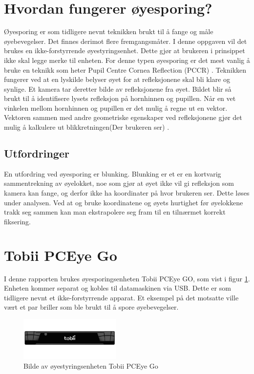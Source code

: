 \documentclass[phd,tocprelim]{cornell}
\begin{document}
\section{Hvordan fungerer øyesporing?}

Øyesporing er som tidligere nevnt teknikken brukt til å fange og måle øyebevegelser.
Det finnes derimot flere fremgangsmåter. I denne oppgaven vil det brukes en ikke-forstyrrende øyestyringsenhet. Dette gjør at brukeren i prinsippet ikke skal legge merke til enheten. For denne typen øyesporing er det mest vanlig å bruke en teknikk som heter Pupil Centre Cornea Reflection (\gls{PCCR}) \cite{Calibration}. Teknikken fungerer ved at en lyskilde belyser øyet for at refleksjonene skal bli klare og synlige. Et kamera tar deretter bilde av refleksjonene fra øyet. Bildet blir så brukt til å identifisere lysets refleksjon på hornhinnen og pupillen. Når en vet vinkelen mellom hornhinnen og pupillen er det mulig å regne ut en vektor. Vektoren sammen med andre geometriske egenskaper ved refleksjonene gjør det mulig å kalkulere ut blikkretningen(Der brukeren ser) \cite{Calibration}.


\subsection{Utfordringer}

En utfordring ved øyesporing er blunking. Blunking er et er en kortvarig sammentrekning av øyelokket, noe som gjør at øyet ikke vil gi refleksjon som kamera kan fange, og derfor ikke ha koordinater på hvor brukeren ser. Dette løses under analysen. Ved at og bruke koordinatene og øyets hurtighet før øyelokkene trakk seg sammen kan man ekstrapolere seg fram til en tilnærmet korrekt fiksering. 

\section{Tobii PCEye Go}

I denne rapporten brukes øyesporingsenheten Tobii PCEye GO, som vist i figur \ref{fig:tobiiPc}. Enheten kommer separat og kobles til datamaskinen via USB. Dette er som tidligere nevnt et ikke-forstyrrende apparat. Et eksempel på det motsatte ville vært et par briller som ble brukt til å spore øyebevegelser. 



\begin{figure}[ht!]
\centering
\includegraphics[width=50mm]{TobiiEyeGo}
\caption{Bilde av øyestyringsenheten Tobii PCEye Go}
\label{fig:tobiiPc}
\end{figure}
\end{document}
